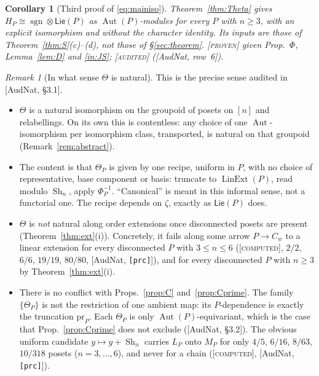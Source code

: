 \documentclass[11pt]{article}
\newtheorem{corollary}[theorem]{Corollary}
\theoremstyle{definition}
\theoremstyle{remark}
\newtheorem{remark}[theorem]{Remark}
\newcommand{\Lin}{\operatorname{LinExt}}
\newcommand{\Aut}{\operatorname{Aut}}
\newcommand{\sgn}{\operatorname{sgn}}
\newcommand{\PLie}{\mathsf{Lie}}
\newcommand{\Sh}{\operatorname{Sh}}
\newcommand{\st}[1]{\textup{[\textsc{#1}]}}
\begin{document}
\begin{corollary}[Third proof of \eqref{eq:mainiso}]\label{cor:thirdproof}
Theorem~\ref{thm:Theta} gives $H_P\cong\sgn\otimes\PLie(P)$ as
$\Aut(P)$-modules for every $P$ with $n\ge3$, with an explicit isomorphism and
without the character identity. Its inputs are those of
Theorem~\ref{thm:S}(c)--(d), not those of \S\ref{sec:theorem}. \st{proven}
given Prop.~$\Phi$, Lemma~\ref{lem:D} and \ref{in:JS}; \st{audited}
([AudNat, row~6]).
\end{corollary}

\begin{remark}[In what sense $\Theta$ is natural]\label{rem:Thetasense}
This is the precise sense audited in [AudNat, \S3.1].
\begin{itemize}[nosep]
\item $\Theta$ is a natural isomorphism on the groupoid of posets on $[n]$
  and relabellings. On its own this is contentless: any choice of one
  $\Aut$-isomorphism per isomorphism class, transported, is natural on that
  groupoid (Remark~\ref{rem:abstract}).
\item The content is that $\Theta_P$ is given by one recipe, uniform in $P$,
  with no choice of representative, base component or basis: truncate to
  $\Lin(P)$, read modulo $\Sh_n$, apply $\Phi_P^{-1}$. ``Canonical'' is meant
  in this informal sense, not a functorial one. The recipe depends on
  $\zeta$, exactly as $\PLie(P)$ does.
\item $\Theta$ is \emph{not} natural along order extensions once
  disconnected posets are present (Theorem~\ref{thm:ext}(i)). Concretely, it
  fails along some arrow $P\to C_w$ to a linear extension for every
  disconnected $P$ with $3\le n\le6$ (\st{computed}, $2/2$, $6/6$, $19/19$,
  $80/80$, [AudNat, \texttt{[prc]}]), and for every disconnected $P$ with
  $n\ge3$ by Theorem~\ref{thm:ext}(i).
\item There is no conflict with Props.~\ref{prop:C} and~\ref{prop:Cprime}.
  The family $\{\Theta_P\}$ is not the restriction of one ambient map: its
  $P$-dependence is exactly the truncation $\mathrm{pr}_P$. Each $\Theta_P$
  is only $\Aut(P)$-equivariant, which is the case that Prop.~\ref{prop:Cprime}
  does not exclude ([AudNat, \S3.2]). The obvious uniform candidate
  $y\mapsto y+\Sh_n$ carries $L_P$ onto $M_P$ for only $4/5$, $6/16$, $8/63$,
  $10/318$ posets ($n=3,\dots,6$), and never for a chain (\st{computed},
  [AudNat, \texttt{[prc]}]).
\end{itemize}
\end{remark}
\end{document}
